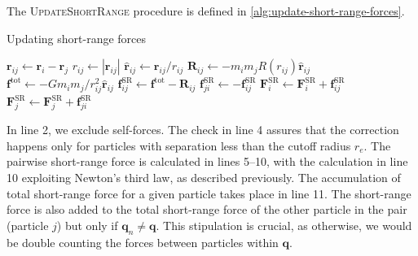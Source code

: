 The \textsc{UpdateShortRange} procedure is defined in \autoref{alg:update-short-range-forces}.
\begin{algorithm}
    \caption{Updating short-range forces}\label{alg:update-short-range-forces}
    \begin{algorithmic}[1]
        \Return
        \EndIf
        \State $\mathbf{r}_{ij} \gets \mathbf{r}_i - \mathbf{r}_j$
        \Return
        \EndIf
        \State $r_{ij} \gets |\mathbf{r}_{ij}|$
        \State $\mathbf{\hat{r}}_{ij} \gets \mathbf{r}_{ij} / r_{ij}$
        \State $\mathbf{R}_{ij} \gets -m_i m_j R(r_{ij}) \mathbf{\hat{r}}_{ij}$
        \State $\mathbf{f}^\text{tot} \gets -G m_i m_j / r_{ij}^2 \mathbf{\hat{r}}_{ij}$
        \State $\mathbf{f}^\text{SR}_{ij} \gets \mathbf{f}^\text{tot} - \mathbf{R}_{ij}$
        \State $\mathbf{f}^\text{SR}_{ji} \gets -\mathbf{f}^\text{SR}_{ij}$
        \State $\mathbf{F}^\text{SR}_i \gets \mathbf{F}^\text{SR}_i + \mathbf{f}^\text{SR}_{ij}$
         
        \State $\mathbf{F}^\text{SR}_j \gets \mathbf{F}^\text{SR}_j + \mathbf{f}^\text{SR}_{ji}$
        \EndIf
        \EndProcedure
    \end{algorithmic}
\end{algorithm}
In line 2, we exclude self-forces.
The check in line 4 assures that the correction happens only for particles with separation less than the cutoff radius $r_e$.
The pairwise short-range force is calculated in lines 5--10, with the calculation in line 10 exploiting Newton's third law, as described previously.
The accumulation of total short-range force for a given particle takes place in line 11.
The short-range force is also added to the total short-range force of the other particle in the pair (particle $j$) but only if $\mathbf{q}_n \neq \mathbf{q}$.
This stipulation is crucial, as otherwise, we would be double counting the forces between particles within $\mathbf{q}$.

